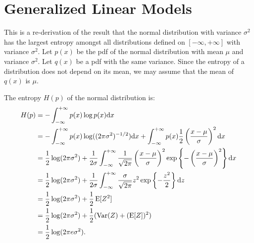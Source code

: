 \chapter{Generalized Linear Models}

This is a re-derivation of the result that the normal distribution with variance
$\sigma^2$ has the largest entropy amongst all distributions defined on
$[-\infty, +\infty]$ with variance $\sigma^2$. Let $p(x)$ be the pdf of the
normal distribution with mean $\mu$ and variance $\sigma^2$. Let $q(x)$ be a
pdf with the same variance. Since the entropy of a distribution does not depend
on its mean, we may assume that the mean of $q(x)$ is $\mu$.

The entropy $H(p)$ of the normal distribution is:
\begin{align*}
    H(p) & = - \int_{- \infty}^{+ \infty} p(x) \log p(x) \mathrm{d} x \\
        & = - \int_{- \infty}^{+ \infty} p(x) \log ((2 \pi \sigma^2)^{-1/2}) \mathrm{d} x
            + \int_{- \infty}^{+ \infty} p(x) \frac{1}{2} \left ( \frac{x - \mu}{\sigma} \right )^2 \mathrm{d} x \\
        & = \frac{1}{2} \log (2 \pi \sigma^2)
            + \frac{1}{2 \sigma} \int_{- \infty}^{+ \infty} \frac{1}{\sqrt{2 \pi}} \left ( \frac{x - \mu}{\sigma} \right )^2
            \exp \left \{- \left ( \frac{x - \mu}{\sigma} \right )^2 \right \} \mathrm{d} x \\
        & = \frac{1}{2} \log (2 \pi \sigma^2) +
            \frac{1}{2 \sigma} \int_{- \infty}^{+ \infty}
            \frac{\sigma}{\sqrt{2 \pi}} z^2 \exp \left \{- \frac{z^2}{2} \right \} \mathrm{d} z \\
        & = \frac{1}{2} \log (2 \pi \sigma^2) + \frac{1}{2} \operatorname{E} [Z^2] \\
        & = \frac{1}{2} \log (2 \pi \sigma^2) + \frac{1}{2} (\operatorname{Var}(Z) + (\operatorname{E} [Z])^2) \\
        & = \frac{1}{2} \log (2 \pi e \sigma^2).
\end{align*}

